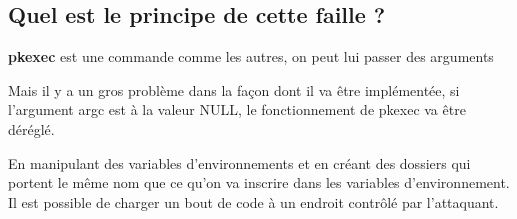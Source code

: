 \documentclass[12pt,a4paper]{article}
\begin{document}
   		\subsection{Quel est le principe de cette faille ?}
   		\begin{flushleft}
   			\noindent \textbf{pkexec} est une commande comme les autres, on peut lui passer des arguments
   			\item Mais il y a un gros problème dans la façon dont il va être implémentée, si l'argument argc est à la valeur NULL, le fonctionnement de pkexec va être déréglé. 
   			\item En manipulant des variables d'environnements et en créant des dossiers qui portent le même nom que ce qu'on va inscrire dans les variables d'environnement. Il est possible de charger un bout de code à un endroit contrôlé par l'attaquant. 
   		\end{flushleft}
   		
\end{document}
